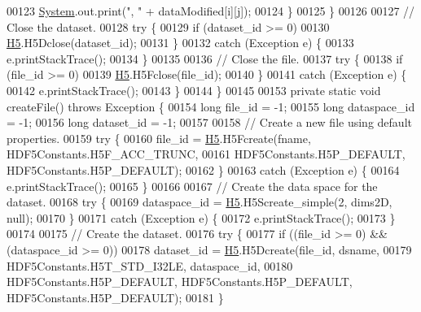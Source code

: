 \begin{DoxyCode}
00123                 \hyperlink{namespace_system}{System}.out.print(\textcolor{stringliteral}{", "} + dataModified[i][j]);
00124             \}
00125         \}
00126 
00127         \textcolor{comment}{// Close the dataset.}
00128         \textcolor{keywordflow}{try} \{
00129             \textcolor{keywordflow}{if} (dataset\_id >= 0)
00130                 \hyperlink{namespace_h5}{H5}.H5Dclose(dataset\_id);
00131         \}
00132         \textcolor{keywordflow}{catch} (Exception e) \{
00133             e.printStackTrace();
00134         \}
00135 
00136         \textcolor{comment}{// Close the file.}
00137         \textcolor{keywordflow}{try} \{
00138             \textcolor{keywordflow}{if} (file\_id >= 0)
00139                 \hyperlink{namespace_h5}{H5}.H5Fclose(file\_id);
00140         \}
00141         \textcolor{keywordflow}{catch} (Exception e) \{
00142             e.printStackTrace();
00143         \}
00144     \}
00145 
00153     \textcolor{keyword}{private} \textcolor{keyword}{static} \textcolor{keywordtype}{void} createFile() \textcolor{keywordflow}{throws} Exception \{
00154         \textcolor{keywordtype}{long} file\_id = -1;
00155         \textcolor{keywordtype}{long} dataspace\_id = -1;
00156         \textcolor{keywordtype}{long} dataset\_id = -1;
00157 
00158         \textcolor{comment}{// Create a new file using default properties.}
00159         \textcolor{keywordflow}{try} \{
00160             file\_id = \hyperlink{namespace_h5}{H5}.H5Fcreate(fname, HDF5Constants.H5F\_ACC\_TRUNC,
00161                     HDF5Constants.H5P\_DEFAULT, HDF5Constants.H5P\_DEFAULT);
00162         \}
00163         \textcolor{keywordflow}{catch} (Exception e) \{
00164             e.printStackTrace();
00165         \}
00166 
00167         \textcolor{comment}{// Create the data space for the dataset.}
00168         \textcolor{keywordflow}{try} \{
00169             dataspace\_id = \hyperlink{namespace_h5}{H5}.H5Screate\_simple(2, dims2D, null);
00170         \}
00171         \textcolor{keywordflow}{catch} (Exception e) \{
00172             e.printStackTrace();
00173         \}
00174 
00175         \textcolor{comment}{// Create the dataset.}
00176         \textcolor{keywordflow}{try} \{
00177             \textcolor{keywordflow}{if} ((file\_id >= 0) && (dataspace\_id >= 0))
00178                 dataset\_id = \hyperlink{namespace_h5}{H5}.H5Dcreate(file\_id, dsname,
00179                         HDF5Constants.H5T\_STD\_I32LE, dataspace\_id,
00180                         HDF5Constants.H5P\_DEFAULT, HDF5Constants.H5P\_DEFAULT, HDF5Constants.H5P\_DEFAULT);
00181         \}

\end{DoxyCode}
